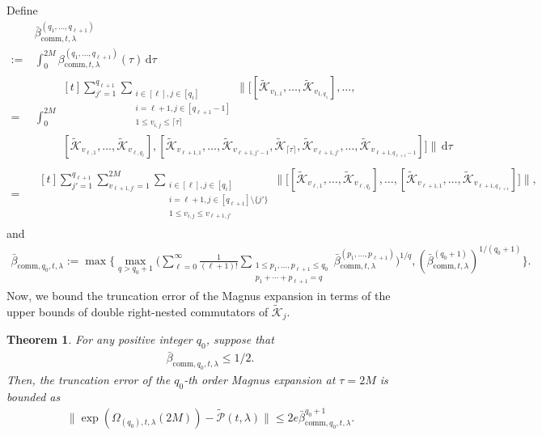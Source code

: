 \documentclass[11pt]{article}
\newtheorem{theorem}{Theorem}
\renewcommand{\d}{\mathrm{d}}
\renewcommand{\comm}{\mathrm{comm}}
\newcommand{\mc}{\mathcal}
\begin{document}
Define \begin{align}
    &\bar{\beta}_{\comm,t,\lambda}^{(q_1, \ldots, q_{\ell+1})}\nonumber\\
    :=~&\int_{0}^{2M}\beta^{(q_1, \ldots, q_{\ell+1})}_{\comm, t,\lambda}(\tau)\,\d \tau\nonumber\\
    =~&\int_{0}^{2M}\begin{multlined}[t]
        \sum_{j'=1}^{q_{\ell+1}} \sum_{\substack{
            i\in[\ell], j\in[q_i] \\
            i=\ell+1, j\in[q_{\ell+1}-1] \\
            1\le v_{i,j} \le \lceil\tau\rceil
        }} \bigg\| \Big[ 
            [\tilde{\mc K}_{v_{1,1}}, \ldots, \tilde{\mc K}_{v_{1,q_1}}], \ldots, \\ 
             [\tilde{\mc K}_{v_{\ell,1}}, \ldots, \tilde{\mc K}_{v_{\ell,q_\ell}}], 
            [\tilde{\mc K}_{v_{\ell+1,1}}, \ldots, \tilde{\mc K}_{v_{\ell+1,j'-1}},\tilde{\mc K}_{\lceil\tau\rceil},\tilde{\mc K}_{v_{\ell+1,j'}}, \ldots, \tilde{\mc K}_{v_{\ell+1,q_{\ell+1}-1}}]
            \Big] \bigg\|\,\d \tau\nonumber
    \end{multlined} \\
    =~&\begin{multlined}[t]
        \sum_{j'=1}^{q_{\ell+1}}\sum_{v_{\ell+1,j'}=1}^{2M} \sum_{\substack{
            i\in[\ell], j\in[q_i] \\
            i=\ell+1, j\in[q_{\ell+1}]\setminus \{j'\} \\
            1\le v_{i,j} \le v_{\ell+1,j'}
        }} \bigg\| \Big[ 
            [\tilde{\mc K}_{v_{\ell,1}}, \ldots, \tilde{\mc K}_{v_{\ell,q_\ell}}], \ldots, 
            [\tilde{\mc K}_{v_{\ell+1,1}}, \ldots, \tilde{\mc K}_{v_{\ell+1,q_{\ell+1}}}]
            \Big] \bigg\|,\label{eq:def-mueta-bar}
    \end{multlined}
\end{align}
and \begin{align}
    \bar{\beta}_{\comm,q_0,t,\lambda}:=\max\Biggl\{\max_{q>q_0+1}\Biggl(\sum_{\ell=0}^{\infty}\frac{1}{(\ell+1)!}\sum_{\substack{1\le p_1, \ldots, p_{\ell+1}\le q_0\\p_1+\cdots+p_{\ell+1}=q}}\bar{\beta}_{\comm, t,\lambda}^{(p_1, \ldots, p_{\ell+1})}\Biggr)^{1/q}, (\bar{\beta}_{\comm, t,\lambda}^{(q_0+1)})^{1/(q_0+1)}\Biggr\}.
\end{align}
Now, we bound the truncation error of the Magnus expansion in terms of the upper bounds of double right-nested commutators of $\tilde{\mc K}_j$.
\begin{theorem}
    \label{thm:truncation-magnus}
    For any positive integer $q_0$, suppose that \begin{align*}
         \bar{\beta}_{\comm,q_0,t,\lambda}\le 1/2.
    \end{align*}
    Then, the truncation error of the $q_0$-th order Magnus expansion at $\tau = 2M$ is bounded as \begin{align*}
         \|\exp(\Omega_{(q_0), t,\lambda}(2M))-\tilde{\mc P}(t,\lambda)\|\le 2e\bar{\beta}_{\comm,q_0,t,\lambda}^{q_0+1}.
    \end{align*}
\end{theorem}
\end{document}
